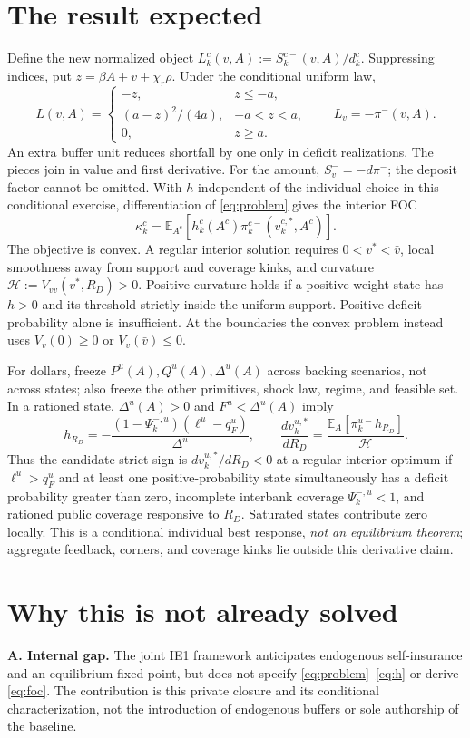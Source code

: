 \documentclass[11pt]{article}
\begin{document}
\section{The result expected}
Define the new normalized object $L_k^c(v,A):=S_k^{c-}(v,A)/d_k^c$. Suppressing indices, put $z=\beta A+v+\chi_r\rho$. Under the conditional uniform law,
\[
 L(v,A)=\begin{cases}-z,&z\le-a,\\(a-z)^2/(4a),&-a<z<a,\\0,&z\ge a.\end{cases}
 \qquad L_v=-\pi^-(v,A).
\]
An extra buffer unit reduces shortfall by one only in deficit realizations. The pieces join in value and first derivative. For the amount, $S_v^-=-d\pi^-$; the deposit factor cannot be omitted. With $h$ independent of the individual choice in this conditional exercise, differentiation of \eqref{eq:problem} gives the interior FOC
\begin{equation}\label{eq:foc}
 \kappa_k^c=\mathbb E_{A^c}[h_k^c(A^c)\pi_k^{c-}(v_k^{c,*},A^c)].
\end{equation}
The objective is convex. A regular interior solution requires $0<v^*<\bar v$, local smoothness away from support and coverage kinks, and curvature $\mathcal H:=V_{vv}(v^*,R_D)>0$. Positive curvature holds if a positive-weight state has $h>0$ and its threshold strictly inside the uniform support. Positive deficit probability alone is insufficient. At the boundaries the convex problem instead uses $V_v(0)\ge0$ or $V_v(\bar v)\le0$.

For dollars, freeze $P^u(A),Q^u(A),\Delta^u(A)$ across backing scenarios, not across states; also freeze the other primitives, shock law, regime, and feasible set. In a rationed state, $\Delta^u(A)>0$ and $F^u<\Delta^u(A)$ imply
\[
 h_{R_D}=-\frac{(1-\Psi_k^{-,u})(\ell^u-q_F^u)}{\Delta^u},
 \qquad \frac{dv_k^{u,*}}{dR_D}
 =\frac{\mathbb E_A[\pi_k^{u-}h_{R_D}]}{\mathcal H}.
\]
Thus the candidate strict sign is $dv_k^{u,*}/dR_D<0$ at a regular interior optimum if $\ell^u>q_F^u$ and at least one positive-probability state simultaneously has a deficit probability greater than zero, incomplete interbank coverage $\Psi_k^{-,u}<1$, and rationed public coverage responsive to $R_D$. Saturated states contribute zero locally. This is a conditional individual best response, \emph{not an equilibrium theorem}; aggregate feedback, corners, and coverage kinks lie outside this derivative claim.

\section{Why this is not already solved}
\textbf{A. Internal gap.} The joint IE1 framework anticipates endogenous self-insurance and an equilibrium fixed point, but does not specify \eqref{eq:problem}--\eqref{eq:h} or derive \eqref{eq:foc}. The contribution is this private closure and its conditional characterization, not the introduction of endogenous buffers or sole authorship of the baseline.
\end{document}
